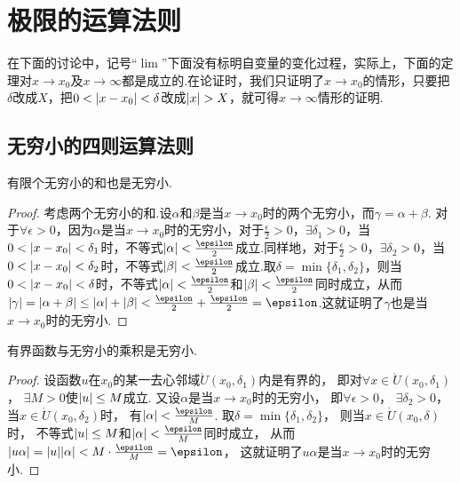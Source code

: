 \section{极限的运算法则}\label{section:极限.极限的运算法则}
在下面的讨论中，记号“\(\lim\)”下面没有标明自变量的变化过程，实际上，下面的定理对\(x \to x_0\)及\(x \to \infty\)都是成立的.在论证时，我们只证明了\(x \to x_0\)的情形，只要把\(\delta\)改成\(X\)，把\(0<\abs{x-x_0}<\delta\)改成\(\abs{x}>X\)，就可得\(x \to \infty\)情形的证明.

\subsection{无穷小的四则运算法则}
\begin{theorem}
有限个无穷小的和也是无穷小.
\begin{proof}
考虑两个无穷小的和.设\(\alpha\)和\(\beta\)是当\(x \to x_0\)时的两个无穷小，而\(\gamma = \alpha+\beta\).
对于\(\forall\epsilon>0\)，因为\(\alpha\)是当\(x \to x_0\)时的无穷小，对于\(\frac{\epsilon}{2}>0\)，\(\exists \delta_1 > 0\)，当\(0<\abs{x-x_0}<\delta_1\)时，不等式\(\abs{\alpha}<\frac{\epsilon}{2}\)成立.同样地，对于\(\frac{\epsilon}{2}>0\)，\(\exists \delta_2 > 0\)，当\(0<\abs{x-x_0}<\delta_2\)时，不等式\(\abs{\beta}<\frac{\epsilon}{2}\)成立.取\(\delta=\min\{\delta_1,\delta_2\}\)，则当\(0<\abs{x-x_0}<\delta\)时，不等式\(\abs{\alpha}<\frac{\epsilon}{2}\)和\(\abs{\beta}<\frac{\epsilon}{2}\)同时成立，从而\(\abs{\gamma}=\abs{\alpha+\beta}\leq\abs{\alpha}+\abs{\beta}<\frac{\epsilon}{2}+\frac{\epsilon}{2}=\epsilon\).这就证明了\(\gamma\)也是当\(x \to x_0\)时的无穷小.
\end{proof}
\end{theorem}

\begin{theorem}
有界函数与无穷小的乘积是无穷小.
\begin{proof}
设函数\(u\)在\(x_0\)的某一去心邻域\(\mathring{U}(x_0,\delta_1)\)内是有界的，
即对\(\forall x\in\mathring{U}(x_0,\delta_1)\)，
\(\exists M>0\)使\(\abs{u} \leq M\)成立.
又设\(\alpha\)是当\(x \to x_0\)时的无穷小，
即\(\forall \epsilon > 0\)，
\(\exists \delta_2 > 0\)，
当\(x\in\mathring{U}(x_0,\delta_2)\)时，
有\(\abs{\alpha}<\frac{\epsilon}{M}\).
取\(\delta=\min\{\delta_1,\delta_2\}\)，
则当\(x\in\mathring{U}(x_0,\delta)\)时，
不等式\(\abs{u} \leq M\)和\(\abs{\alpha} < \frac{\epsilon}{M}\)同时成立，
从而\(\abs{u \alpha} = \abs{u}\abs{\alpha} < M \cdot \frac{\epsilon}{M} = \epsilon\)，
这就证明了\(u \alpha\)是当\(x \to x_0\)时的无穷小.
\end{proof}
\end{theorem}

